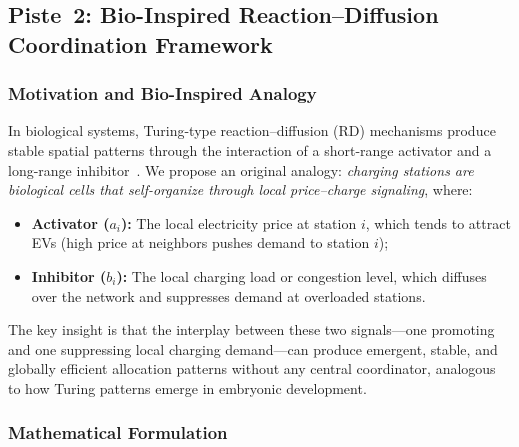 \documentclass[review]{elsarticle}
\begin{document}
\subsection{Piste~2: Bio-Inspired Reaction--Diffusion Coordination Framework}\label{sec:piste2}

\subsubsection{Motivation and Bio-Inspired Analogy}

\hspace{0.5cm}In biological systems, Turing-type reaction--diffusion (RD) mechanisms produce stable spatial patterns through the interaction of a short-range activator and a long-range inhibitor~\cite{turing1952chemical,kondo2010reaction}. We propose an original analogy: \textit{charging stations are biological cells that self-organize through local price--charge signaling}, where:
\begin{itemize}
    \item \textbf{Activator ($a_i$):} The local electricity price at station $i$, which tends to attract EVs (high price at neighbors pushes demand to station $i$);
    \item \textbf{Inhibitor ($b_i$):} The local charging load or congestion level, which diffuses over the network and suppresses demand at overloaded stations.
\end{itemize}

\hspace{0.5cm}The key insight is that the interplay between these two signals---one promoting and one suppressing local charging demand---can produce emergent, stable, and globally efficient allocation patterns without any central coordinator, analogous to how Turing patterns emerge in embryonic development.

\subsubsection{Mathematical Formulation}
\end{document}
